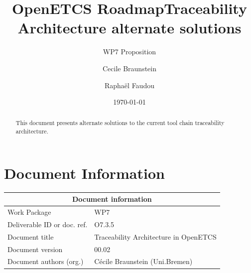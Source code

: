 \documentclass[11pt]{template/openetcs_report}
\begin{document}
\frontmatter
{}




\title{OpenETCS Roadmap}




\date{\today}
\title{Traceability Architecture alternate solutions}
\subtitle{WP7 Proposition}

\techassessorname{}
\techassessoraffil{}

\qualityassessorname{}
\qualityassessoraffil{}

\approvalname{}
\approvalaffil{}
\author{Cecile Braunstein}

\author{Raphaël Faudou}





\begin{abstract}
This document presents alternate solutions to the current tool chain traceability
architecture.
\end{abstract}


\maketitle
\tableofcontents

\newpage

\chapter{Document Information}

\begin{tabular}{|p{4.4cm}|p{8.7cm}|}
\hline
\multicolumn{2}{|c|}{Document information} \\
\hline
Work Package &  WP7  \\
Deliverable ID or doc. ref. & O7.3.5\\
\hline
Document title &Traceability Architecture in OpenETCS \\
Document version & 00.02 \\
Document authors (org.)  & Cécile Braunstein (Uni.Bremen) \\
\hline
\end{tabular}
\end{document}
